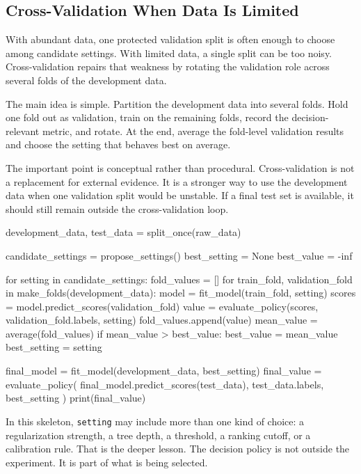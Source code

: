 \subsection{Cross-Validation When Data Is Limited}

With abundant data, one protected validation split is often enough to choose among candidate settings. With limited data, a single split can be too noisy. Cross-validation repairs that weakness by rotating the validation role across several folds of the development data.

The main idea is simple. Partition the development data into several folds. Hold one fold out as validation, train on the remaining folds, record the decision-relevant metric, and rotate. At the end, average the fold-level validation results and choose the setting that behaves best on average.

The important point is conceptual rather than procedural. Cross-validation is not a replacement for external evidence. It is a stronger way to use the development data when one validation split would be unstable. If a final test set is available, it should still remain outside the cross-validation loop.

\begin{codeexample}[caption={Selection discipline when the decision policy is part of the model choice}]
development_data, test_data = split_once(raw_data)

candidate_settings = propose_settings()
best_setting = None
best_value = -inf

for setting in candidate_settings:
    fold_values = []
    for train_fold, validation_fold in make_folds(development_data):
        model = fit_model(train_fold, setting)
        scores = model.predict_scores(validation_fold)
        value = evaluate_policy(scores, validation_fold.labels, setting)
        fold_values.append(value)
    mean_value = average(fold_values)
    if mean_value > best_value:
        best_value = mean_value
        best_setting = setting

final_model = fit_model(development_data, best_setting)
final_value = evaluate_policy(
    final_model.predict_scores(test_data),
    test_data.labels,
    best_setting
)
print(final_value)
\end{codeexample}

In this skeleton, \texttt{setting} may include more than one kind of choice: a regularization strength, a tree depth, a threshold, a ranking cutoff, or a calibration rule. That is the deeper lesson. The decision policy is not outside the experiment. It is part of what is being selected.

